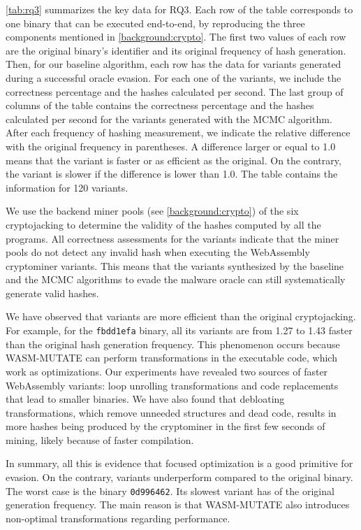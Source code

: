   \autoref{tab:rq3} summarizes the key data for RQ3.
  Each row of the table corresponds to one binary that can be executed end-to-end, by reproducing the three components mentioned in \autoref{background:crypto}.
  The first two values of each row are the original binary's identifier and its original frequency of hash generation.
  Then, for our baseline algorithm, each row has the data for  variants generated during a successful oracle evasion.
  For each one of the variants, we include the correctness percentage and the hashes calculated per second.
  The last group of columns of the table contains the correctness percentage and the hashes calculated per second for the  variants generated with the MCMC algorithm.
  After each frequency of hashing measurement, we indicate the relative difference with the original frequency in parentheses.
  A difference larger or equal to 1.0 means that the variant is faster or as efficient as the original. On the contrary, the variant is slower if the difference is lower than 1.0.
  The table contains the information for 120 variants.
  

We use the backend miner pools (see \autoref{background:crypto}) of the six cryptojacking to determine the validity of the hashes computed by all the programs.
All correctness assessments for the  variants indicate that the miner pools do not detect any invalid hash when executing the WebAssembly cryptominer variants.
This means that the variants synthesized by the baseline and the MCMC algorithms to evade the malware oracle can still systematically generate valid hashes. 


We have observed that  variants are more efficient than the original cryptojacking.
For example, for the \texttt{fbdd1efa} binary, all its variants are from 1.27 to 1.43 faster than the original hash generation frequency.
This phenomenon occurs because WASM-MUTATE can perform transformations in the executable code, which work as optimizations.
Our experiments have revealed two sources of faster WebAssembly variants: loop unrolling transformations and code replacements that lead to smaller binaries. 
We have also found that debloating transformations, which remove unneeded structures and dead code, results in more hashes being produced by the cryptominer in the first few seconds of mining, likely because of faster compilation.

In summary, all this is evidence that focused optimization is a good primitive for evasion. 
On the contrary,  variants underperform compared to the original binary.
The worst case is the binary \texttt{0d996462}.
Its slowest variant has  of the original generation frequency.
The main reason is that WASM-MUTATE also introduces non-optimal transformations regarding performance.

